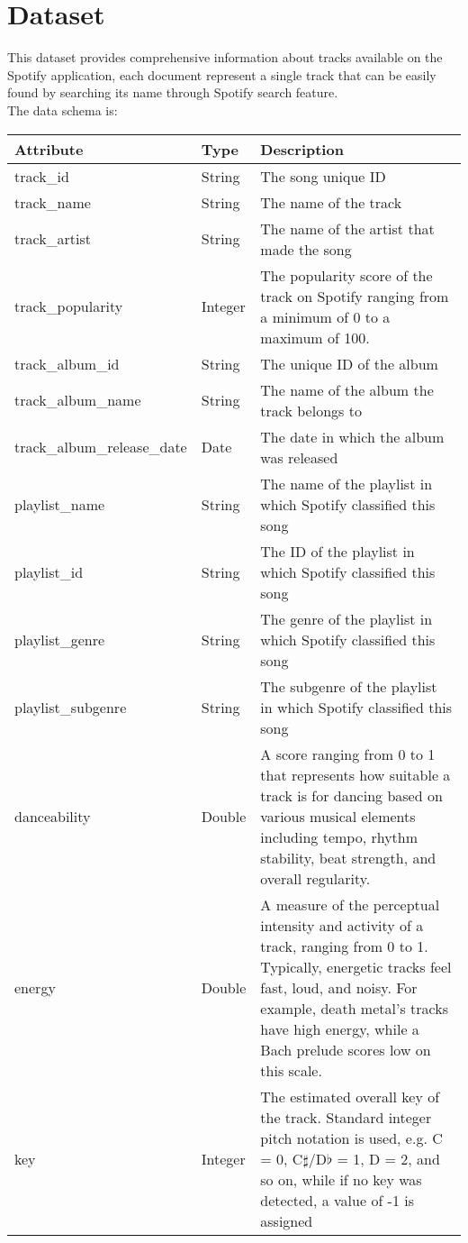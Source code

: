 \documentclass{Configuration_Files/PoliMi3i_thesis}
\begin{document}
\section{Dataset}
This dataset provides comprehensive information about tracks available on the Spotify application, each document represent a single track that can be easily found by searching its name through Spotify search feature.\\
The data schema is:
\begin{table}[h!]
	\begin{center}
		\begin{tabular}{|m{12em}|m{4em}|m{25em}|}
		\hline
		\textbf{Attribute} & \textbf{Type} & \textbf{Description}\\
		\hline
			track\_id & String & The song unique ID\\
		\hline
			track\_name & String & The name of the track\\
		\hline
			track\_artist & String & The name of the artist that made the song\\
		\hline
			track\_popularity & Integer & The popularity score of the track on Spotify ranging from a minimum of 0 to a maximum of 100.\\
		\hline
			track\_album\_id & String & The unique ID of the album\\
		\hline
			track\_album\_name & String & The name of the album the track belongs to\\
		\hline
			track\_album\_release\_date & Date & The date in which the album was released\\
		\hline
			playlist\_name & String & The name of the playlist in which Spotify classified this song\\
		\hline
			playlist\_id & String & The ID of the playlist in which Spotify classified this song\\
		\hline
			playlist\_genre & String & The genre of the playlist in which Spotify classified this song\\
		\hline
			playlist\_subgenre & String & The subgenre of the playlist in which Spotify classified this song\\
		\hline
			danceability & Double & A score ranging from 0 to 1 that represents how suitable a track is for dancing based on various musical elements including tempo, rhythm stability, beat strength, and overall regularity.\\
		\hline
			energy & Double & A measure of the perceptual intensity and activity of a track, ranging from 0 to 1. Typically, energetic tracks feel fast, loud, and noisy. For example, death metal's tracks have high energy, while a Bach prelude scores low on this scale.\\
		\hline
			key & Integer & The estimated overall key of the track. Standard integer pitch notation is used, e.g. C = 0, C$\sharp$/D$\flat$ = 1, D = 2, and so on, while if no key was detected, a value of -1 is assigned\\
		\hline
		\end{tabular}
	\end{center}
\end{table}\newpage
\end{document}
